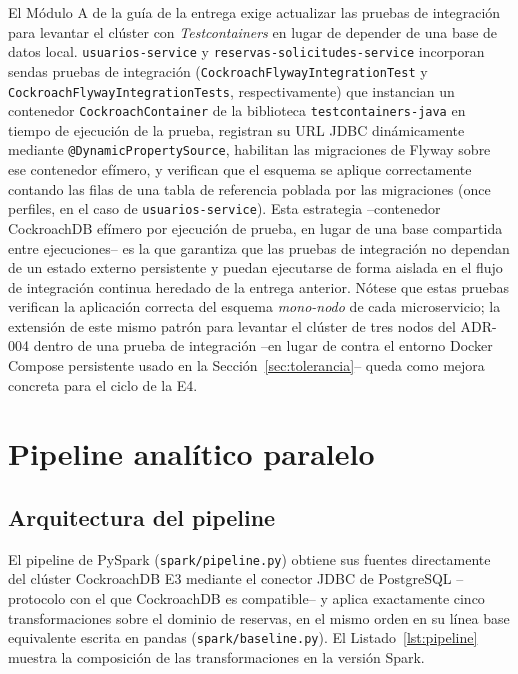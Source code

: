 \documentclass[10pt,twocolumn]{article}
\begin{document}
El Módulo A de la guía de la entrega exige actualizar las pruebas de
integración para levantar el clúster con \emph{Testcontainers} en lugar de
depender de una base de datos local. \texttt{usuarios-service} y
\texttt{reservas-solicitudes-service} incorporan sendas pruebas de
integración (\texttt{CockroachFlywayIntegrationTest} y
\texttt{CockroachFlywayIntegrationTests}, respectivamente) que instancian
un contenedor \texttt{CockroachContainer} de la biblioteca
\texttt{testcontainers-java} en tiempo de ejecución de la prueba,
registran su URL JDBC dinámicamente mediante
\texttt{@DynamicPropertySource}, habilitan las migraciones de Flyway sobre
ese contenedor efímero, y verifican que el esquema se aplique
correctamente contando las filas de una tabla de referencia poblada por
las migraciones (once perfiles, en el caso de
\texttt{usuarios-service}). Esta estrategia --contenedor CockroachDB
efímero por ejecución de prueba, en lugar de una base compartida entre
ejecuciones-- es la que garantiza que las pruebas de integración no
dependan de un estado externo persistente y puedan ejecutarse de forma
aislada en el flujo de integración continua heredado de la entrega
anterior. Nótese que estas pruebas verifican la aplicación correcta del
esquema \emph{mono-nodo} de cada microservicio; la extensión de este mismo
patrón para levantar el clúster de tres nodos del ADR-004 dentro de una
prueba de integración --en lugar de contra el entorno Docker Compose
persistente usado en la Sección~\ref{sec:tolerancia}-- queda como mejora
concreta para el ciclo de la E4.

\section{Pipeline analítico paralelo}
\label{sec:pipeline}

\subsection{Arquitectura del pipeline}

El pipeline de PySpark (\texttt{spark/pipeline.py}) obtiene sus fuentes
directamente del clúster CockroachDB E3 mediante el conector JDBC de
PostgreSQL --protocolo con el que CockroachDB es compatible-- y aplica
exactamente cinco transformaciones sobre el dominio de reservas, en el
mismo orden en su línea base equivalente escrita en pandas
(\texttt{spark/baseline.py}). El Listado~\ref{lst:pipeline} muestra la
composición de las transformaciones en la versión Spark.
\end{document}
